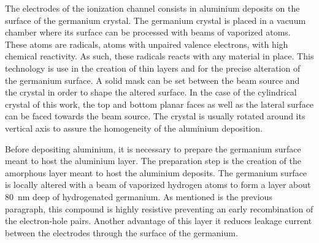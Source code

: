 The electrodes of the ionization channel consists in aluminium deposits on the surface of the germanium crystal. The germanium crystal is placed in a vacuum chamber where its surface can be processed with beams of vaporized atoms. These atoms are radicals, atoms with unpaired valence electrons, with high chemical reactivity. As such, these radicals reacts with any material in place. This technology is use in the creation of thin layers and for the precise alteration of the germanium surface. A solid mask can be set between the beam source and the crystal in order to shape the altered surface. In the case of the cylindrical crystal of this work, the top and bottom planar faces as well as the lateral surface can be faced towards the beam source. The crystal is usually rotated around its vertical axis to assure the homogeneity of the aluminium deposition. 

Before depositing aluminium, it is necessary to prepare the germanium surface meant to host the aluminium layer. The preparation step is the creation of the amorphous layer meant to host the aluminium deposits. The germanium surface is locally altered with a beam of vaporized hydrogen atoms to form a layer about \SI{80}{\nm} deep of hydrogenated germanium. As mentioned is the previous paragraph, this compound is highly resistive preventing an early recombination of the electron-hole pairs. Another advantage of this layer it reduces leakage current between the electrodes through the surface of the germanium.

